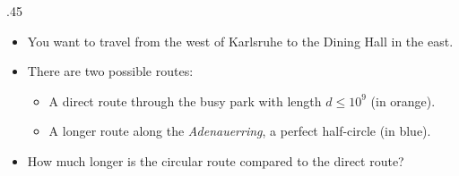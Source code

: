 \begin{frame}
  \frametitle{\problemtitle}

  \begin{columns}
    \begin{column}[T]{.45\textwidth}
      \begin{itemize}
      \item You want to travel from the west of Karlsruhe to the
        Dining Hall in the east.
      \item There are two possible routes:
        \begin{itemize}
        \normalsize
        \item A direct route through the busy park with length $d \leq 10^9$ (in orange).
        \item A longer route along the \emph{Adenauerring}, a perfect half-circle (in blue).
        \end{itemize}
      \item How much longer is the circular route compared to the direct route?
      \end{itemize}

    \end{column}

  \end{columns}
\end{frame}
